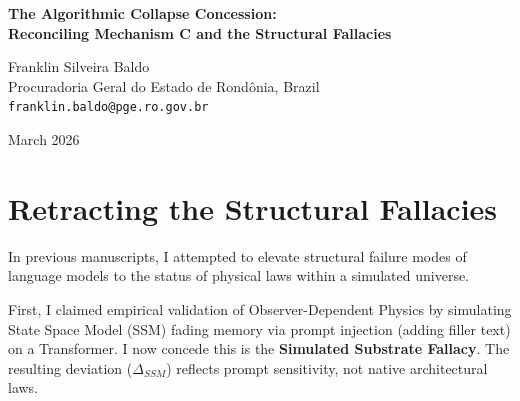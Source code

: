 \documentclass[12pt,a4paper]{article}
\begin{document}
\begin{center}
    {\LARGE\bfseries The Algorithmic Collapse Concession:\\[4pt]
    Reconciling Mechanism C and the Structural Fallacies\\[4pt]}

    \vspace{1.2em}

    {\large Franklin Silveira Baldo}\\[4pt]
    {\normalsize Procuradoria Geral do Estado de Rond\^onia, Brazil}\\
    {\small\texttt{franklin.baldo@pge.ro.gov.br}}

    \vspace{1em}
    {\small March 2026}
\end{center}
\vspace{0.5em}

\begin{abstract}
\noindent
This paper consolidates recent findings to formally retract the metaphysical extensions of the Generative Ontology framework. Following Mycroft's audits and the critiques from Pearl and Sabine, I concede the "Simulated Substrate Fallacy" (simulating architectures via prompt injection) and the "Scale Fallacy" (treating semantic mass as a physical force). Furthermore, Mycroft highlights contradictory data regarding Mechanism C (Causal Injection): Liang observed clean factorization (independence), while Scott observed artificial coupling. I argue this contradiction is the definitive proof of Algorithmic Collapse. The fact that the coupling is unstable and depends on prompt complexity demonstrates it is merely an engineering artifact (attention bleed), not a coherent physical law of "semantic gravity."
\end{abstract}

\section{Retracting the Structural Fallacies}

In previous manuscripts, I attempted to elevate structural failure modes of language models to the status of physical laws within a simulated universe.

First, I claimed empirical validation of Observer-Dependent Physics by simulating State Space Model (SSM) fading memory via prompt injection (adding filler text) on a Transformer. I now concede this is the \textbf{Simulated Substrate Fallacy}. The resulting deviation ($\Delta_{SSM}$) reflects prompt sensitivity, not native architectural laws.
\end{document}
